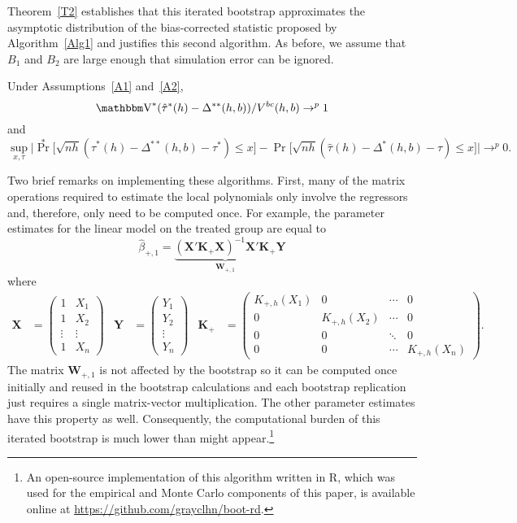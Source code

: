 \documentclass[12pt,fleqn]{article}
\begin{document}
Theorem~\ref{T2} establishes that this iterated bootstrap approximates the
asymptotic distribution of the bias-corrected statistic proposed by
Algorithm~\ref{Alg1} and justifies this second algorithm.  As before, we assume
that $B_1$ and $B_2$ are large enough that simulation error can be ignored.

\begin{theorem}\label{T2}
  Under Assumptions~\ref{A1} and~\ref{A2},
  \begin{equation*}
    \V^*(\hat\tau^{*}(h) - \Delta^{**}(h,b))/V^{bc}(h,b) \to^p 1
  \end{equation*}
  and
  \begin{equation*}
    \sup_{x,\tau}
    \Big\rvert \Pr^*\big[ \sqrt{nh}
    (\hat\tau^{*}(h) - \Delta^{**}(h,b) - \tau^*) \leq x \big]
    - \Pr\big[ \sqrt{nh}
    (\hat\tau(h) - \Delta^*(h,b) - \tau) \leq x \big] \Big\lvert \to^p 0.
  \end{equation*}
\end{theorem}

Two brief remarks on implementing these algorithms. First, many of the matrix operations
required to estimate the local polynomials only involve the regressors and,
therefore, only need to be computed once. For example, the parameter estimates
for the linear model on the treated group are equal to
\[
\hat\beta_{+,1} = \underbrace{(\mathbf{X}' \mathbf{K}_+ \mathbf{X})^{-1} \mathbf{X}' \mathbf{K}_+}_{\mathbf{W}_{+,1}} \mathbf{Y}
\]
where
\begin{align*}
\mathbf{X} &= \begin{pmatrix*} 1 & X_1 \\ 1 & X_2 \\ \vdots & \vdots \\ 1 & X_n \end{pmatrix*} &
\mathbf{Y} &= \begin{pmatrix*} Y_1 \\ Y_2 \\ \vdots \\ Y_n \end{pmatrix*} &
\mathbf{K}_+ &= \begin{pmatrix*}
  K_{+,h}(X_1) & 0 & \cdots & 0 \\
  0 & K_{+,h}(X_2) & \cdots & 0 \\
  0 & 0 & \ddots & 0 \\
  0 & 0 & \cdots & K_{+,h}(X_n) \end{pmatrix*}.
\end{align*}
The matrix $\mathbf{W}_{+,1}$ is not affected by the bootstrap so it can be
computed once initially and reused in the bootstrap calculations and each
bootstrap replication just requires a single matrix-vector multiplication. The
other parameter estimates have this property as well. Consequently, the
computational burden of this iterated bootstrap is much lower than might
appear.\footnote{%
  An open-source implementation of this algorithm written in R, which was used
  for the empirical and Monte Carlo components of this paper, is available
  online at \url{https://github.com/grayclhn/boot-rd}.} %
\end{document}
